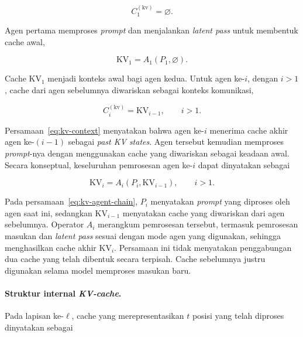 \begin{equation}
    C_1^{(\text{kv})}=\varnothing.
    \label{eq:kv-context-first}
\end{equation}

Agen pertama memproses \textit{prompt} dan menjalankan
\textit{latent pass} untuk membentuk cache awal,

\begin{equation}
    \mathrm{KV}_1
    =
    A_1\left(P_1,\varnothing\right).
    \label{eq:kv-first-agent}
\end{equation}

Cache $\mathrm{KV}_1$ menjadi konteks awal bagi agen kedua.
Untuk agen ke-$i$, dengan $i>1$, cache dari agen sebelumnya
diwariskan sebagai konteks komunikasi,

\begin{equation}
    C_i^{(\text{kv})}
    =
    \mathrm{KV}_{i-1},
    \qquad i>1.
    \label{eq:kv-context}
\end{equation}

Persamaan~\eqref{eq:kv-context} menyatakan bahwa agen ke-$i$
menerima cache akhir agen ke-$(i-1)$ sebagai
\textit{past KV states}. Agen tersebut kemudian memproses
\textit{prompt}-nya dengan menggunakan cache yang diwariskan
sebagai keadaan awal. Secara konseptual, keseluruhan pemrosesan
agen ke-$i$ dapat dinyatakan sebagai

\begin{equation}
    \mathrm{KV}_i
    =
    A_i\left(P_i,\mathrm{KV}_{i-1}\right),
    \qquad i>1.
    \label{eq:kv-agent-chain}
\end{equation}

Pada persamaan~\eqref{eq:kv-agent-chain}, $P_i$ menyatakan
\textit{prompt} yang diproses oleh agen saat ini, sedangkan
$\mathrm{KV}_{i-1}$ menyatakan cache yang diwariskan dari agen
sebelumnya. Operator $A_i$ merangkum pemrosesan tersebut, termasuk
pemrosesan masukan dan \textit{latent pass} sesuai dengan mode
agen yang digunakan, sehingga menghasilkan cache akhir
$\mathrm{KV}_i$. Persamaan ini tidak menyatakan penggabungan
dua cache yang telah dibentuk secara terpisah. Cache sebelumnya
justru digunakan selama model memproses masukan baru.

\paragraph{Struktur internal \textit{KV-cache}.}

Pada lapisan ke-$\ell$, cache yang merepresentasikan $t$ posisi
yang telah diproses dinyatakan sebagai

